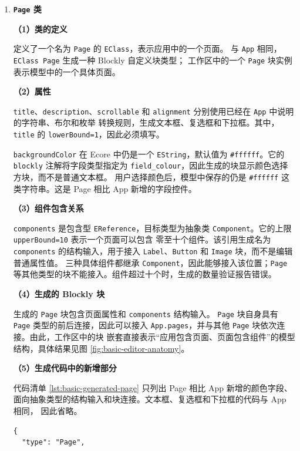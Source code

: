 \begin{enumerate}
  \item \textbf{\texttt{Page} 类}

  \textbf{（1）类的定义}

  定义了一个名为 \texttt{Page} 的 \texttt{EClass}，表示应用中的一个页面。
  与 \texttt{App} 相同，\texttt{EClass Page} 生成一种 Blockly 自定义块类型；
  工作区中的一个 \texttt{Page} 块实例表示模型中的一个具体页面。

  \textbf{（2）属性}

  \texttt{title}、\texttt{description}、\texttt{scrollable} 和
  \texttt{alignment} 分别使用已经在 \texttt{App} 中说明的字符串、布尔和枚举
  转换规则，生成文本框、复选框和下拉框。其中，\texttt{title} 的
  \texttt{lowerBound=1}，因此必须填写。

  \texttt{backgroundColor} 在 Ecore 中仍是一个 \texttt{EString}，默认值为
  \texttt{\#ffffff}。它的 \texttt{blockly} 注解将字段类型指定为
  \texttt{field\_colour}，因此生成的块显示颜色选择方块，而不是普通文本框。
  用户选择颜色后，模型中保存的仍是 \texttt{\#ffffff} 这类字符串。这是 Page
  相比 App 新增的字段控件。

  \textbf{（3）组件包含关系}

  \texttt{components} 是包含型 \texttt{EReference}，目标类型为抽象类
  \texttt{Component}。它的上限 \texttt{upperBound=10} 表示一个页面可以包含
  零至十个组件。该引用生成名为 \texttt{components} 的结构输入，用于接入
  \texttt{Label}、\texttt{Button} 和 \texttt{Image} 块，而不是编辑普通属性值。
  三种具体组件都继承 \texttt{Component}，因此能够接入该位置；\texttt{Page}
  等其他类型的块不能接入。组件超过十个时，生成的数量验证报告错误。

  \textbf{（4）生成的 Blockly 块}

  生成的 \texttt{Page} 块包含页面属性和 \texttt{components} 结构输入。
  \texttt{Page} 块自身具有 \texttt{Page} 类型的前后连接，因此可以接入
  \texttt{App.pages}，并与其他 \texttt{Page} 块依次连接。由此，工作区中的块
  嵌套直接表示“应用包含页面、页面包含组件”的模型结构，具体结果见图
  \ref{fig:basic-editor-anatomy}。

  \textbf{（5）生成代码中的新增部分}

  代码清单 \ref{lst:basic-generated-page} 只列出 Page 相比 App 新增的颜色字段、
  面向抽象类型的结构输入和块连接。文本框、复选框和下拉框的代码与 App 相同，
  因此省略。

\begin{lstlisting}[style=tfmjavascript, captionpos=t, caption={\texttt{Page} 块生成代码中的新增部分}, label={lst:basic-generated-page}]
{
  "type": "Page",


\end{lstlisting}
\end{enumerate}
